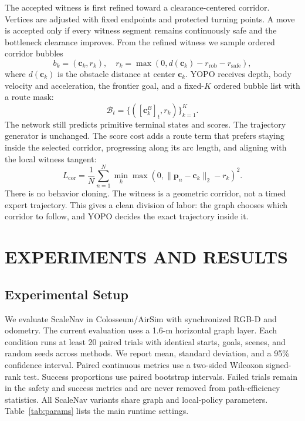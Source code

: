 \documentclass[letterpaper,10pt,conference]{ieeeconf}
\newcommand{\vect}[1]{\boldsymbol{#1}}
\begin{document}
The accepted witness is first refined toward a clearance-centered corridor.
Vertices are adjusted with fixed endpoints and protected turning points. A
move is accepted only if every witness segment remains continuously safe and
the bottleneck clearance improves.
From the refined witness we sample ordered corridor bubbles
\begin{equation}
 b_k=(\vect{c}_k,r_k),\quad
 r_k=\max\left(0,d(\vect{c}_k)-r_{\mathrm{rob}}-r_{\mathrm{safe}}\right),
\label{eq:bubble}
\end{equation}
where $d(\vect{c}_k)$ is the obstacle distance at center $\vect{c}_k$.
YOPO receives depth, body velocity and acceleration, the frontier goal, and
a fixed-$K$ ordered bubble list with a route mask:
\begin{equation}
 \mathcal{B}_t=\{([\vect{c}_k^{B}]_t,r_k)\}_{k=1}^{K}.
\label{eq:route_input}
\end{equation}
The network still predicts primitive terminal states and scores. The
trajectory generator is unchanged.
The score cost adds a route term that prefers staying inside the selected
corridor, progressing along its arc length, and aligning with the local
witness tangent:
\begin{equation}
 L_{\mathrm{cor}}=\frac{1}{N}\sum_{n=1}^{N}
 \min_k\max\left(0,\|\vect{p}_n-\vect{c}_k\|_2-r_k\right)^2.
\label{eq:corridor_loss}
\end{equation}
There is no behavior cloning. The witness is a geometric corridor, not a
timed expert trajectory.
This gives a clean division of labor: the graph chooses which corridor to
follow, and YOPO decides the exact trajectory inside it.

\section{EXPERIMENTS AND RESULTS}
\label{sec:experiments}

\subsection{Experimental Setup}
We evaluate ScaleNav in Colosseum/AirSim \cite{airsim} with synchronized
RGB-D and odometry. The current evaluation uses a 1.6-m horizontal graph
layer.
Each condition runs at least 20 paired trials with identical starts, goals,
scenes, and random seeds across methods.
We report mean, standard deviation, and a 95\% confidence interval. Paired
continuous metrics use a two-sided Wilcoxon signed-rank test. Success
proportions use paired bootstrap intervals. Failed trials remain in the
safety and success metrics and are never removed from path-efficiency
statistics.
All ScaleNav variants share graph and local-policy parameters.
Table~\ref{tab:params} lists the main runtime settings.
\end{document}
